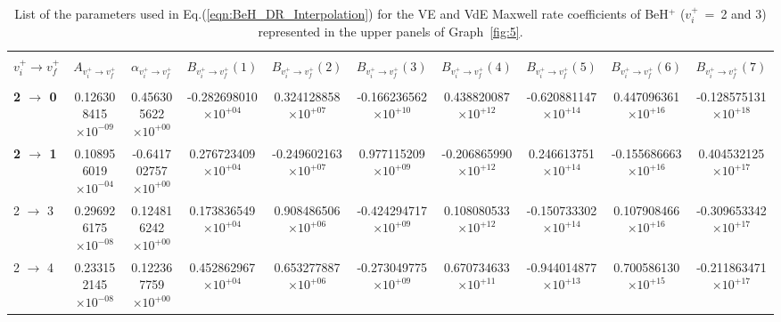 \documentclass[reviewcopy]{elsarticle}
\begin{document}
\newpage
%
\begin{landscape}
\renewcommand{\thefootnote}{\fnsymbol{footnote}}
\renewcommand{\arraystretch}{0.81}
\scriptsize
\setlength\tabcolsep{1.2ex}
\begin{longtable}{lccccccccc}
\caption[table3]{List of the parameters used in Eq.(\ref{eqn:BeH_DR_Interpolation}) for the VE and VdE Maxwell rate coefficients of BeH$^+$  ($v^+_i$~=~2 and 3) represented in the upper panels of Graph~\ref{fig:5}.} \label{tab:BeH_VE_Interpolation2-3}\vspace{0.5cm}\\
\hline \\[-2ex]
   \multicolumn{1}{c}{$v^+_i \to v^+_f$} &
   \multicolumn{1}{c}{$A_{{v^+_i}\to {v^+_f}}$} &
   \multicolumn{1}{c}{$\alpha_{{v^+_i}\to {v^+_f}}$} &
   \multicolumn{1}{c}{$B_{{v^+_i}\to {v^+_f}}(1)$} &
   \multicolumn{1}{c}{$B_{{v^+_i}\to {v^+_f}}(2)$} &
   \multicolumn{1}{c}{$B_{{v^+_i}\to {v^+_f}}(3)$} &
   \multicolumn{1}{c}{$B_{{v^+_i}\to {v^+_f}}(4)$}  &
   \multicolumn{1}{c}{$B_{{v^+_i}\to {v^+_f}}(5)$} &
   \multicolumn{1}{c}{$B_{{v^+_i}\to {v^+_f}}(6)$} &
   \multicolumn{1}{c}{$B_{{v^+_i}\to {v^+_f}}(7)$} \\[5pt]
 \hline \\[-2ex]
\endhead
{\bf 2 $\to$ 0}  & 0.126308415$\times10^{-09}$  & 0.456305622$\times10^{+00}$  & -0.282698010$\times10^{+04}$  & 0.324128858$\times10^{+07}$  & -0.166236562$\times10^{+10}$  & 0.438820087$\times10^{+12}$  & -0.620881147$\times10^{+14}$  & 0.447096361$\times10^{+16}$  & -0.128575131$\times10^{+18}$ \\
{\bf 2 $\to$ 1}  & 0.108956019$\times10^{-04}$  & -0.641702757$\times10^{+00}$  & 0.276723409$\times10^{+04}$  & -0.249602163$\times10^{+07}$  & 0.977115209$\times10^{+09}$  & -0.206865990$\times10^{+12}$  & 0.246613751$\times10^{+14}$  & -0.155686663$\times10^{+16}$  & 0.404532125$\times10^{+17}$ \\
2 $\to$ 3  & 0.296926175$\times10^{-08}$  & 0.124816242$\times10^{+00}$  & 0.173836549$\times10^{+04}$  & 0.908486506$\times10^{+06}$  & -0.424294717$\times10^{+09}$  & 0.108080533$\times10^{+12}$  & -0.150733302$\times10^{+14}$  & 0.107908466$\times10^{+16}$  & -0.309653342$\times10^{+17}$ \\
2 $\to$ 4  & 0.233152145$\times10^{-08}$  & 0.122367759$\times10^{+00}$  & 0.452862967$\times10^{+04}$  & 0.653277887$\times10^{+06}$  & -0.273049775$\times10^{+09}$  & 0.670734633$\times10^{+11}$  & -0.944014877$\times10^{+13}$  & 0.700586130$\times10^{+15}$  & -0.211863471$\times10^{+17}$ \\

\end{longtable}
\end{landscape}
\end{document}
